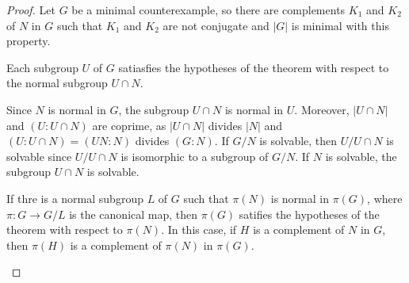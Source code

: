 %
%
%

\begin{proof}
	Let $G$ be a minimal counterexample, so there are complements $K_1$ and 
	$K_2$ of $N$ in $G$ such that $K_1$ and $K_2$ are not conjugate and $|G|$ is minimal with this
	property. 
	
	\begin{claim}
		Each subgroup $U$ of $G$ satiasfies the hypotheses of the theorem with
		respect to the normal subgroup $U\cap N$.
	\end{claim}
	
	Since $N$ is normal in $G$, the subgroup $U\cap N$ is normal in $U$. Moreover, $|U\cap N|$ and 
	$(U:U\cap N)$ are coprime, as $|U\cap N|$ divides $|N|$ and $(U:U\cap
	N)=(UN:N)$ divides $(G:N)$. If $G/N$ is solvable, then $U/U\cap N$
	is solvable since $U/U\cap N$ is isomorphic to a subgroup of $G/N$. If $N$ is
	solvable, the subgroup $U\cap N$ is solvable. 
	

	\begin{claim}
		If thre is a normal subgroup $L$ of $G$ such that $\pi(N)$ is normal in 
		$\pi(G)$, where $\pi\colon G\to G/L$ is the canonical map, then 
		$\pi(G)$ satifies the hypotheses of the theorem with respect to $\pi(N)$.
		In this case, if $H$ is a complement of $N$ in $G$, then $\pi(H)$ is a complement
		of $\pi(N)$ in $\pi(G)$.
	\end{claim}


\end{proof}
